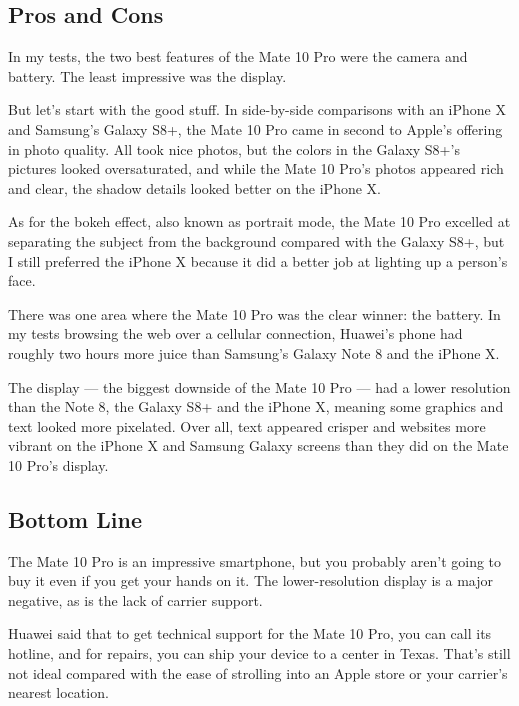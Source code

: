 \hypertarget{pros-and-cons}{%
\subsection{Pros and Cons}\label{pros-and-cons}}

In my tests, the two best features of the Mate 10 Pro were the camera
and battery. The least impressive was the display.

But let's start with the good stuff. In side-by-side comparisons with an
iPhone X and Samsung's Galaxy S8+, the Mate 10 Pro came in second to
Apple's offering in photo quality. All took nice photos, but the colors
in the Galaxy S8+'s pictures looked oversaturated, and while the Mate 10
Pro's photos appeared rich and clear, the shadow details looked better
on the iPhone X.

As for the bokeh effect, also known as portrait mode, the Mate 10 Pro
excelled at separating the subject from the background compared with the
Galaxy S8+, but I still preferred the iPhone X because it did a better
job at lighting up a person's face.

There was one area where the Mate 10 Pro was the clear winner: the
battery. In my tests browsing the web over a cellular connection,
Huawei's phone had roughly two hours more juice than Samsung's Galaxy
Note 8 and the iPhone X.

The display --- the biggest downside of the Mate 10 Pro --- had a lower
resolution than the Note 8, the Galaxy S8+ and the iPhone X, meaning
some graphics and text looked more pixelated. Over all, text appeared
crisper and websites more vibrant on the iPhone X and Samsung Galaxy
screens than they did on the Mate 10 Pro's display.

\hypertarget{bottom-line}{%
\subsection{Bottom Line}\label{bottom-line}}

The Mate 10 Pro is an impressive smartphone, but you probably aren't
going to buy it even if you get your hands on it. The lower-resolution
display is a major negative, as is the lack of carrier support.

Huawei said that to get technical support for the Mate 10 Pro, you can
call its hotline, and for repairs, you can ship your device to a center
in Texas. That's still not ideal compared with the ease of strolling
into an Apple store or your carrier's nearest location.

